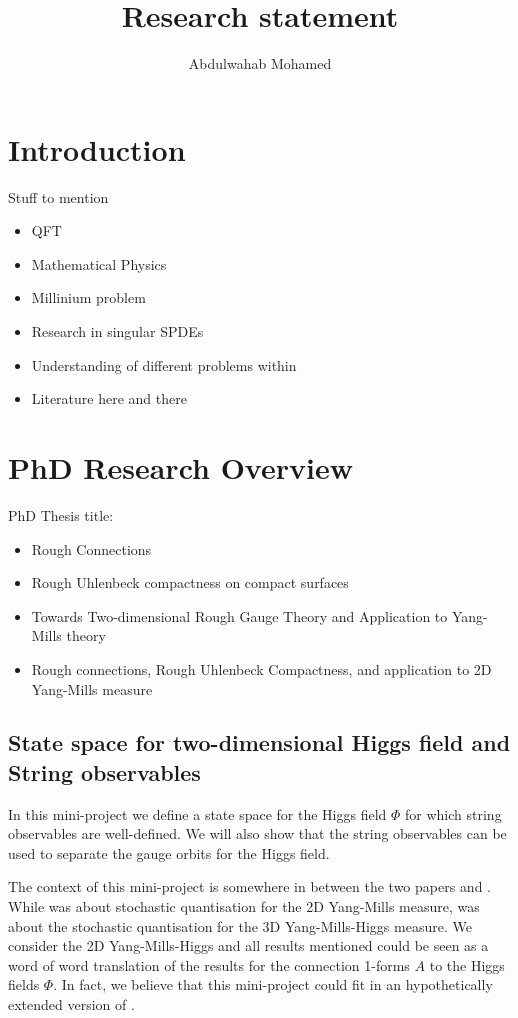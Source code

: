 \documentclass[12pt]{article}
\title{Research statement}
\author{Abdulwahab Mohamed}
\numberwithin{equation}{section}
\theoremstyle{definition}
\theoremstyle{remark}
\newcommand{\1}{\mathbf 1}
\newcommand{\<}{\langle}
\renewcommand{\>}{\rangle}
\begin{document}
\maketitle


\section{Introduction}
Stuff to mention 
\begin{itemize}
    \item QFT
    \item Mathematical Physics
    \item Millinium problem
    \item Research in singular SPDEs
    \item Understanding of different problems within
    \item Literature here and there
\end{itemize}
\section{PhD Research Overview}
PhD Thesis title: 
\begin{itemize}
    \item Rough Connections
    \item Rough Uhlenbeck compactness on compact surfaces
    \item  Towards Two-dimensional Rough Gauge Theory and Application to Yang-Mills theory
    \item Rough connections, Rough Uhlenbeck Compactness, and application to 2D Yang-Mills measure 
\end{itemize}

\subsection{State space for two-dimensional Higgs field and String observables}
In this mini-project we define a state space for the Higgs field $\Phi$ for which string observables are well-defined. We will also show that the string observables can be used to separate the gauge orbits for the Higgs field. 

The context of this mini-project is somewhere in between the two papers \cite{CCHS_2D_YM} and \cite{CCHS_3D_YMH}. While \cite{CCHS_2D_YM} was about stochastic quantisation for the 2D Yang-Mills measure, \cite{CCHS_3D_YMH} was about the stochastic quantisation for the 3D Yang-Mills-Higgs measure. We consider the 2D Yang-Mills-Higgs and all results mentioned could be seen as a word of word translation of the results for the connection 1-forms $A$ to the Higgs fields $\Phi$. In fact, we believe that this mini-project could fit in an hypothetically extended version of \cite{CCHS_2D_YM}.  
\end{document}
